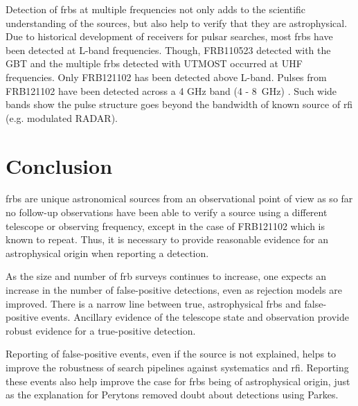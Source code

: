 \documentclass[a4paper,fleqn,usenatbib]{mnras}
\begin{document}
Detection of \glspl{frb} at multiple frequencies not only adds to the scientific
understanding of the sources, but also help to verify that they are
astrophysical.  Due to historical development of receivers for pulsar searches,
most \glspl{frb} have been detected at L-band frequencies. Though, FRB110523
detected with the GBT and the multiple \glspl{frb} detected with UTMOST occurred
at UHF frequencies.  Only FRB121102 has been detected above L-band.  Pulses from
FRB121102 have been detected across a 4 GHz band (4 - 8~GHz) \citep{atel10675}.
Such wide bands show the pulse structure goes beyond the bandwidth of known
source of \gls{rfi} (e.g. modulated RADAR).

\section{Conclusion}



\glspl{frb} are unique astronomical sources from an observational point of view
as so far no follow-up observations have been able to verify a source using a
different telescope or observing frequency, except in the case of FRB121102
which is known to repeat. Thus, it is necessary to provide reasonable evidence
for an astrophysical origin when reporting a detection. 

As the size and number of \gls{frb} surveys continues to increase, one expects
an increase in the number of false-positive detections, even as rejection models
are improved. There is a narrow line between true, astrophysical \glspl{frb} and
false-positive events. Ancillary evidence of the telescope state and observation
provide robust evidence for a true-positive detection. 

Reporting of false-positive events, even if the source is not explained, helps
to improve the robustness of search pipelines against systematics and \gls{rfi}.
Reporting these events also help improve the case for \glspl{frb} being of
astrophysical origin, just as the explanation for Perytons
\citep{2015MNRAS.451.3933P} removed doubt about detections using Parkes.
\end{document}
